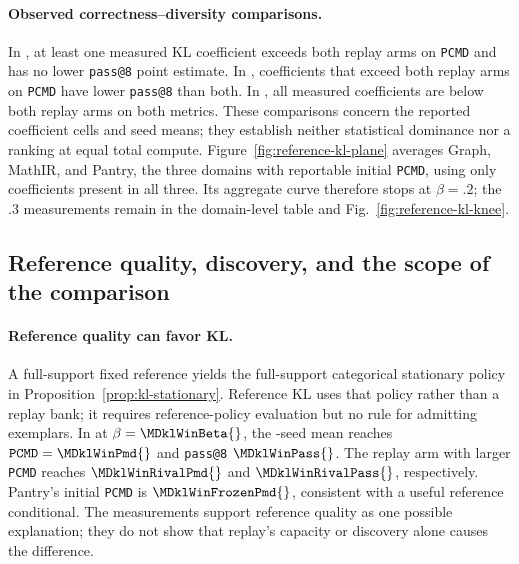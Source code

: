 \documentclass{article}
\newcommand{\1}{\mathbf 1}
\newcommand{\pmd}{\texttt{PCMD}}
\theoremstyle{remark}
\theoremstyle{definition}
\theoremstyle{plain}
\begin{document}
\paragraph{Observed correctness--diversity comparisons.}
In \MDklFreeNames{}, at least one measured KL coefficient exceeds both
replay arms on \pmd{} and has no lower \texttt{pass@8} point estimate.
In \MDklPricedNames{}, coefficients that exceed both replay arms on
\pmd{} have lower \texttt{pass@8} than both. In \MDklMemoryNames{},
all measured coefficients are below both replay arms on both metrics.
These comparisons concern the reported coefficient cells and seed means;
they establish neither statistical dominance nor a ranking at equal total
compute. Figure~\ref{fig:reference-kl-plane} averages Graph, MathIR, and
Pantry, the three domains with reportable initial \pmd{}, using only
coefficients present in all three. Its aggregate curve therefore stops at
$\beta=.2$; the $.3$ measurements remain in the domain-level table and
Fig.~\ref{fig:reference-kl-knee}.

\subsection{Reference quality, discovery, and the scope of the comparison}
\label{app:theory-kl-case}

\paragraph{Reference quality can favor KL.}
A full-support fixed reference yields the full-support categorical
stationary policy in Proposition~\ref{prop:kl-stationary}. Reference KL
uses that policy rather than a replay bank; it requires reference-policy
evaluation but no rule for admitting exemplars. In \MDklWinDomain{} at
$\beta=\MDklWinBeta{}$, the \MDklWinSeeds{}-seed mean reaches
$\pmd{}=\MDklWinPmd{}$ and \texttt{pass@8} $\MDklWinPass{}$.
The replay arm with larger \pmd{} reaches $\MDklWinRivalPmd{}$ and
$\MDklWinRivalPass{}$, respectively. Pantry's initial \pmd{} is
$\MDklWinFrozenPmd{}$, consistent with a useful reference conditional.
The measurements support reference quality as one possible explanation;
they do not show that replay's capacity or discovery alone causes the
difference.
\end{document}
